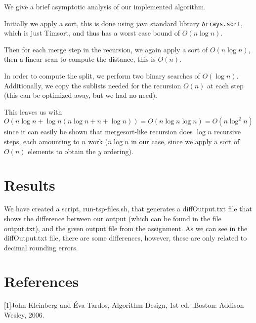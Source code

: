 \documentclass{tufte-handout}
\newcommand{\kleinbergtardos}{[1]}
\begin{document}
  We give a brief asymptotic analysis of our implemented algorithm.


  Initially we apply a sort,
  this is done using java standard library \verb+Arrays.sort+,
  which is just Timsort,
  and thus has a worst case bound of $O(n \log n)$.


  Then for each merge step in the recursion,
  we again apply a sort of $O(n \log n)$,
  then a linear scan to compute the distance, 
  this is $O(n)$.


  In order to compute the split,
  we perform two binary searches of $O(\log n)$.
  Additionally,
  we copy the sublists needed for the recursion $O(n)$
  at each step (this can be optimized away, but we had no need).


  This leaves us with  
  $O(n \log n + \log n (n \log n + n + \log n) ) = O(n \log n \log n) = O(n \log^2 n)$ 
  since it can easily be shown that mergesort-like recursion
  does $\log n$ recursive steps, each amounting to $n$ work 
  ($n \log n$ in our case, since we apply a sort of $O(n)$ elements to obtain the $y$ ordering).



  \section{Results}

  We have created a script, run-tsp-files.sh, that generates a 
  diffOutput.txt file that shows the difference between our output 
  (which can be found in the file output.txt), and the given output file from the assignment.
  As we can see in the diffOutput.txt file, there are some differences,
  however, these are only related to decimal rounding errors.


  \section{References}

  \kleinbergtardos John Kleinberg and Éva Tardos, Algorithm Design, 1st ed. ,Boston: Addison Wesley, 2006.
 
\end{document}
